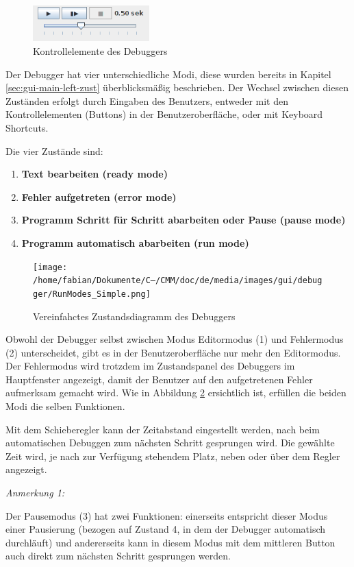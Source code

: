 \begin{figure}[htp]
\centering
\includegraphics[width=0.4\textwidth]{./media/images/gui/debugger/ctrl-elements.png}
\caption{Kontrollelemente des Debuggers}
\label{fig:deb-gui-ctrl}
\end{figure}

Der Debugger hat vier unterschiedliche Modi, diese wurden bereits in Kapitel \ref{sec:gui-main-left-zust} überblicksmäßig beschrieben. Der Wechsel zwischen diesen Zuständen erfolgt durch Eingaben des Benutzers, entweder mit den Kontrollelementen (Buttons) in der Benutzeroberfläche, oder mit Keyboard Shortcuts.

Die vier Zustände sind:
\begin{enumerate}
\item \textbf{Text bearbeiten (ready mode)}
\item \textbf{Fehler aufgetreten (error mode)}
\item \textbf{Programm Schritt für Schritt abarbeiten oder Pause (pause mode)}
\item \textbf{Programm automatisch abarbeiten (run mode)}
\end{enumerate}

\begin{figure}[htp]
\centering
\texttt{[image: /home/fabian/Dokumente/C--/CMM/doc/de/media/images/gui/debugger/RunModes\_Simple.png]}
\caption{Vereinfahctes Zustandsdiagramm des Debuggers}
\label{fig:deb-zust-simple}
\end{figure}

Obwohl der Debugger selbst zwischen Modus Editormodus (1) und Fehlermodus (2) unterscheidet, gibt es in der Benutzeroberfläche nur mehr den Editormodus. Der Fehlermodus wird trotzdem im Zustandspanel des Debuggers im Hauptfenster angezeigt, damit der Benutzer auf den aufgetretenen Fehler aufmerksam gemacht wird. Wie in Abbildung \ref{fig:deb-zust-simple} ersichtlich ist, erfüllen die beiden Modi die selben Funktionen.

Mit dem Schieberegler kann der Zeitabstand eingestellt werden, nach beim automatischen Debuggen zum nächsten Schritt gesprungen wird. Die gewählte Zeit wird, je nach zur Verfügung stehendem Platz, neben oder über dem Regler angezeigt.

\emph{Anmerkung 1:}
\par
\begingroup
\leftskip=1cm %
\noindent Der Pausemodus (3) hat zwei Funktionen: einerseits entspricht dieser Modus einer Pausierung (bezogen auf Zustand 4, in dem der Debugger automatisch durchläuft) und andererseits kann in diesem Modus mit dem mittleren Button auch direkt zum nächsten Schritt gesprungen werden.
\par
\endgroup


